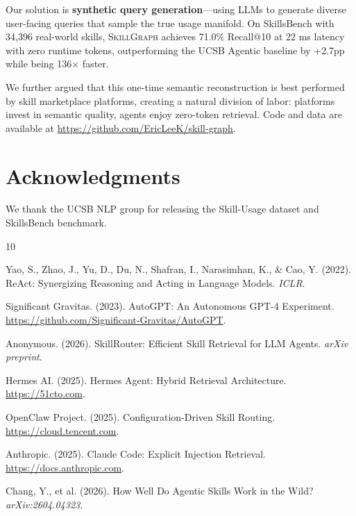 \documentclass[11pt,a4paper]{article}
\newcommand{\ours}{\textsc{SkillGraph}}
\newcommand{\ucsb}{\textsc{UCSB}}
\begin{document}
Our solution is \textbf{synthetic query generation}---using LLMs to generate diverse user-facing queries that sample the true usage manifold. On SkillsBench with 34,396 real-world skills, \ours{} achieves 71.0\% Recall@10 at 22 ms latency with zero runtime tokens, outperforming the \ucsb{} Agentic baseline by +2.7pp while being 136$\times$ faster.

We further argued that this one-time semantic reconstruction is best performed by skill marketplace platforms, creating a natural division of labor: platforms invest in semantic quality, agents enjoy zero-token retrieval. Code and data are available at \url{https://github.com/EricLeeK/skill-graph}.

\section*{Acknowledgments}

We thank the UCSB NLP group for releasing the Skill-Usage dataset and SkillsBench benchmark.


\begin{thebibliography}{10}

Yao, S., Zhao, J., Yu, D., Du, N., Shafran, I., Narasimhan, K., \& Cao, Y. (2022).
ReAct: Synergizing Reasoning and Acting in Language Models.
\textit{ICLR}.

Significant Gravitas. (2023).
AutoGPT: An Autonomous GPT-4 Experiment.
\url{https://github.com/Significant-Gravitas/AutoGPT}.

Anonymous. (2026).
SkillRouter: Efficient Skill Retrieval for LLM Agents.
\textit{arXiv preprint}.

Hermes AI. (2025).
Hermes Agent: Hybrid Retrieval Architecture.
\url{https://51cto.com}.

OpenClaw Project. (2025).
Configuration-Driven Skill Routing.
\url{https://cloud.tencent.com}.

Anthropic. (2025).
Claude Code: Explicit Injection Retrieval.
\url{https://docs.anthropic.com}.

Chang, Y., et al. (2026).
How Well Do Agentic Skills Work in the Wild?
\textit{arXiv:2604.04323}.

\end{thebibliography}
\end{document}

